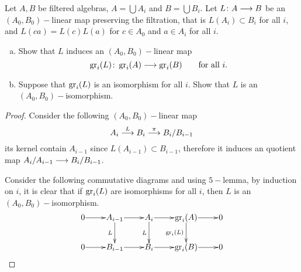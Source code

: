   \begin{ex}
    Let $A,B$ be filtered algebras, $A=\bigcup A_i$ and $B=\bigcup B_i$. Let $L\colon A\longrightarrow B$ be an $(A_0,B_0)-$linear map preserving the filtration, that is $L(A_i)\subset B_i$ for all $i$, and $L(ca)=L(c)L(a)$ for $c\in A_0$ and $a\in A_i$ for all $i$.
    \begin{enumerate}[a)]
      \item Show that $L$ induces an $(A_0,B_0)-$linear map
                 \begin{equation*}
                   \operatorname{gr}_i(L)\colon \operatorname{gr}_i(A)\longrightarrow\operatorname{gr}_i(B) \qquad \text{for all }i.
                 \end{equation*}
      \item Suppose that $\operatorname{gr}_i(L)$ is an isomorphism for all $i$. Show that $L$ is an $(A_0,B_0)-$isomorphism.
    \end{enumerate}
  \end{ex}
  \begin{proof}
    Consider the following $(A_0,B_0)-$linear map
    \begin{equation*}
      A_i\stackrel{{L}}{\longrightarrow}B_i\stackrel{{\pi}}{\longrightarrow}B_i/B_{i-1}
    \end{equation*}
    its kernel contain $A_{i-1}$ since $L(A_{i-1})\subset B_{i-1}$, therefore it induces an quotient map $A_i/A_{i-1}\longrightarrow B_i/B_{i-1}$.

    Consider the following commutative diagrams and using $5-$lemma, by induction on $i$, it is clear that if $\operatorname{gr}_i(L)$ are isomorphisms for all $i$, then $L$ is an $(A_0,B_0)-$isomorphism.
                 \begin{displaymath}
                   \xymatrix@1{
                      0\ar[r] & A_{i-1}\ar[r]\ar[d]_{L} & A_i\ar[r]\ar[d]_{L} & \gr_i(A)\ar[r]\ar[d]_{\gr_i(L)} & 0     \\
                      0\ar[r] & B_{i-1}\ar[r] & B_i\ar[r] & \gr_i(B)\ar[r] & 0            }
                 \end{displaymath}
  \end{proof}

